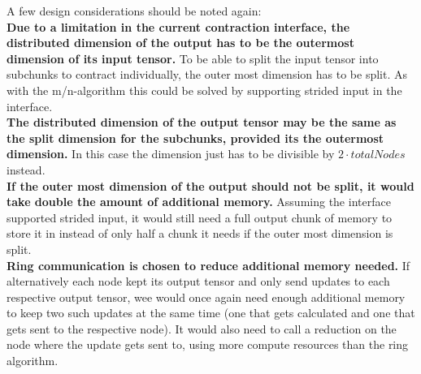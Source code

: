 A few design considerations should be noted again:\\
\textbf{Due to a limitation in the current contraction interface, the distributed dimension of the output has to be the outermost dimension of its input tensor.}
To be able to split the input tensor into subchunks to contract individually, the outer most dimension has to be split.
As with the m/n-algorithm this could be solved by supporting strided input in the interface.\\
\textbf{The distributed dimension of the output tensor may be the same as the split dimension for the subchunks, provided its the outermost dimension.}
In this case the dimension just has to be divisible by $2 \cdot totalNodes$ instead.\\
\textbf{If the outer most dimension of the output should not be split, it would take double the amount of additional memory.}
Assuming the interface supported strided input, it would still need a full output chunk of memory to store it in instead of only half a chunk it needs if the outer most dimension is split.\\
\textbf{Ring communication is chosen to reduce additional memory needed.}
If alternatively each node kept its output tensor and only send updates to each respective output tensor, wee would once again need enough additional memory to keep two such updates at the same time (one that gets calculated and one that gets sent to the respective node).
It would also need to call a reduction on the node where the update gets sent to, using more compute resources than the ring algorithm.


